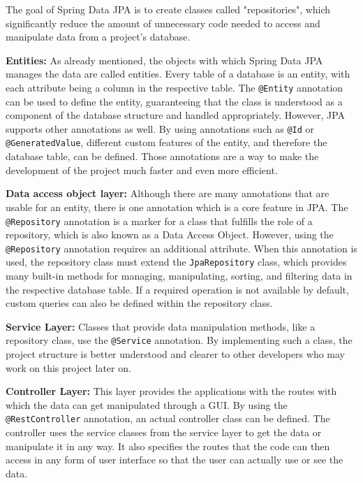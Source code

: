     The goal of Spring Data JPA is to create classes called "repositories", which significantly reduce the amount of unnecessary code needed to access and manipulate data from a project's database. \newline 

    \textbf{Entities:} \newline
    As already mentioned, the objects with which Spring Data JPA manages the data are called entities. Every table of a database is an entity, with each attribute being a column in the respective table. The \texttt{@Entity} annotation can be used to define the entity, guaranteeing that the class is understood as a component of the database structure and handled appropriately. However, JPA supports other annotations as well. By using annotations such as \texttt{@Id} or \texttt{@GeneratedValue}, different custom features of the entity, and therefore the database table, can be defined. Those annotations are a way to make the development of the project much faster and even more efficient. \Autocite{Andi:Entity1, Andi:Entity2, Andi:Entity3} \newline

    \textbf{Data access object layer:} \newline
    Although there are many annotations that are usable for an entity, there is one annotation which is a core feature in JPA. The \texttt{@Repository} annotation is a marker for a class that fulfills the role of a repository, which is also known as a Data Access Object. However, using the \texttt{@Repository} annotation requires an additional attribute.
    When this annotation is used, the repository class must extend the \texttt{JpaRepository} class, which provides many built-in methods for managing, manipulating, sorting, and filtering data in the respective database table. If a required operation is not available by default, custom queries can also be defined within the repository class. \Autocite{Andi:Repo} \newline 

    \textbf{Service Layer:} \newline
    Classes that provide data manipulation methods, like a repository class, use the \texttt{@Service} annotation. By implementing such a class, the project structure is better understood and clearer to other developers who may work on this project later on. \Autocite{Andi:ServiceLayer1,Andi:ServiceLayer2}  \newline 

    \textbf{Controller Layer:} \newline
    This layer provides the applications with the routes with which the data can get manipulated through a GUI. By using the \texttt{@RestController} annotation, an actual controller class can be defined. The controller uses the service classes from the service layer to get the data or manipulate it in any way. It also specifies the routes that the code can then
    access in any form of user interface so that the user can actually use or see the data.
    \Autocite{Andi:ControllerLayer} \newline

